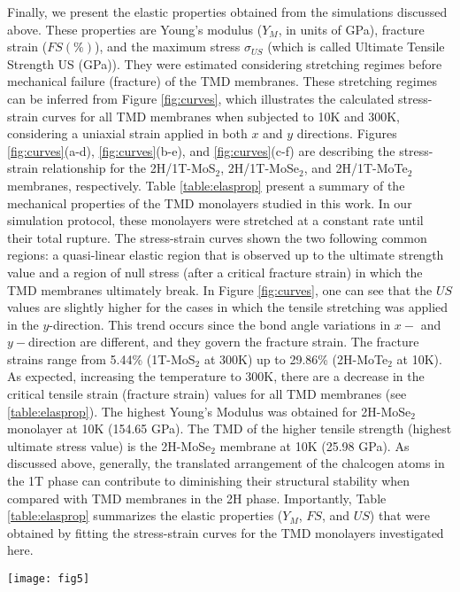 \documentclass[a4paper,fleqn]{cas-sc}
\begin{document}
Finally, we present the elastic properties obtained from the simulations discussed above. These properties are Young's modulus ($Y_{M}$, in units of GPa), fracture strain ($FS (\%)$), and the maximum stress $\sigma_{US}$ (which is called Ultimate Tensile Strength US (GPa)). They were estimated considering stretching regimes before mechanical failure (fracture) of the TMD membranes. These stretching regimes can be inferred from Figure \ref{fig:curves}, which illustrates the calculated stress-strain curves for all TMD membranes when subjected to 10K and 300K, considering a uniaxial strain applied in both $x$ and $y$ directions. Figures \ref{fig:curves}(a-d), \ref{fig:curves}(b-e), and \ref{fig:curves}(c-f) are describing the stress-strain relationship for the 2H/1T-MoS$_2$, 2H/1T-MoSe$_2$, and 2H/1T-MoTe$_2$ membranes, respectively. Table \ref{table:elasprop} present a summary of the mechanical properties of the TMD monolayers studied in this work. In our simulation protocol, these monolayers were stretched at a constant rate until their total rupture. The stress-strain curves shown the two following common regions: a quasi-linear elastic region that is observed up to the ultimate strength value and a region of null stress (after a critical fracture strain) in which the TMD membranes ultimately break. In Figure \ref{fig:curves}, one can see that the $US$ values are slightly higher for the cases in which the tensile stretching was applied in the $y$-direction. This trend occurs since the bond angle variations in $x-$ and $y-$direction are different, and they govern the fracture strain. The fracture strains range from 5.44\% (1T-MoS$_2$ at 300K) up to 29.86\% (2H-MoTe$_2$ at 10K). As expected, increasing the temperature to 300K, there are a decrease in the critical tensile strain (fracture strain) values for all TMD membranes (see \ref{table:elasprop}). The highest Young's Modulus was obtained for 2H-MoSe$_2$ monolayer at 10K (154.65 GPa). The TMD of the higher tensile strength (highest ultimate stress value) is the 2H-MoSe$_{2}$ membrane at 10K (25.98 GPa). As discussed above, generally, the translated arrangement of the chalcogen atoms in the 1T phase can contribute to diminishing their structural stability when compared with TMD membranes in the 2H phase. Importantly, Table \ref{table:elasprop} summarizes the elastic properties ($Y_M$, $FS$, and $US$) that were obtained by fitting the stress-strain curves for the TMD monolayers investigated here.

\begin{figure*}[pos=ht]
\centering
\texttt{[image: fig5]}
\caption{Calculated stress-strain curves for all TMD membranes studied here when subjected to 10K and 300K, considering a uniaxial strain applied in both $x$ and $y$ directions. Figures \ref{fig:curves}(a-d), \ref{fig:curves}(b-e), and \ref{fig:curves}(c-f) are describing the stress-strain relationship for the 2H/1T-MoS$_2$, 2H/1T-MoSe$_2$, and 2H/1T-MoTe$_2$ membranes, respectively.}

\label{fig:curves}
\end{figure*}
\end{document}
